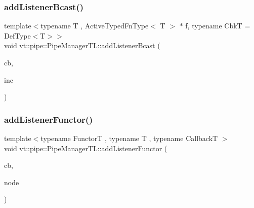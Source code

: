 \subsubsection{\texorpdfstring{add\+Listener\+Bcast()}{addListenerBcast()}\hspace{0.1cm}{\footnotesize\ttfamily [2/2]}}
{\footnotesize\ttfamily template$<$typename T , Active\+Typed\+Fn\+Type$<$ T $>$ $\ast$ f, typename CbkT  = Def\+Type$<$\+T$>$$>$ \\
void vt\+::pipe\+::\+Pipe\+Manager\+T\+L\+::add\+Listener\+Bcast (\begin{DoxyParamCaption}\item[{CbkT const \&}]{cb,  }\item[{bool const \&}]{inc }\end{DoxyParamCaption})}

\mbox{\label{structvt_1_1pipe_1_1_pipe_manager_t_l_aca69c630748b177c01af61b39ffad0ec}} 
\subsubsection{\texorpdfstring{add\+Listener\+Functor()}{addListenerFunctor()}\hspace{0.1cm}{\footnotesize\ttfamily [1/2]}}
{\footnotesize\ttfamily template$<$typename FunctorT , typename T , typename CallbackT $>$ \\
void vt\+::pipe\+::\+Pipe\+Manager\+T\+L\+::add\+Listener\+Functor (\begin{DoxyParamCaption}\item[{CallbackT const \&}]{cb,  }\item[{\hyperlink{namespacevt_a866da9d0efc19c0a1ce79e9e492f47e2}{Node\+Type} const \&}]{node }\end{DoxyParamCaption})}

\mbox{\label{structvt_1_1pipe_1_1_pipe_manager_t_l_abc9236c8ff7a657b1b04fd7604d616b9}} 
